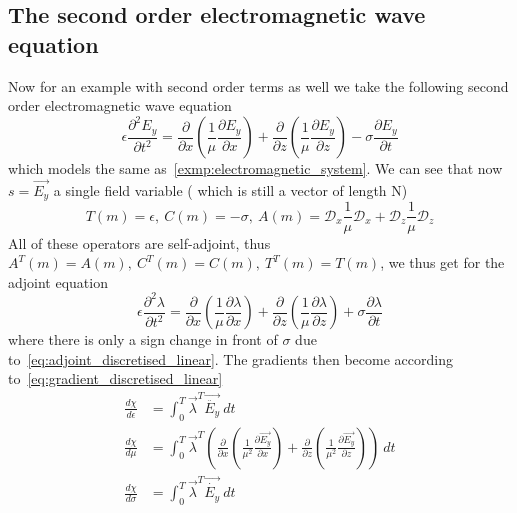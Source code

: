 \documentclass[10pt]{SelfArx} %
\newcommand{\pder}[2][]{\frac{\partial#1}{\partial#2}}
\newcommand{\ppder}[2][]{\frac{\partial^2#1}{\partial#2^2}}
\theoremstyle{definition}
\begin{document}
\subsection{The second order electromagnetic wave equation}
Now for an example with second order terms as well we take the following second order electromagnetic wave equation 
\begin{equation}
\epsilon \ppder[E_y]{t} = \pder{x}\left(\frac{1}{\mu}\pder[E_y]{x}\right) + \pder{z}\left(\frac{1}{\mu} \pder[E_y]{z}\right) - \sigma \pder[E_y]{t} 
\end{equation}
which models the same as~\cref{exmp:electromagnetic_system}. We can see that now $s = \vec{E_y}$ a single field variable ( which is still a vector of length N) 
\begin{equation}
T(m) = \epsilon, \ C(m) = -\sigma, \ A(m) = \mathcal{D}_x\frac{1}{\mu}\mathcal{D}_x + \mathcal{D}_z \frac{1}{\mu} \mathcal{D}_z
\end{equation}
All of these operators are self-adjoint, thus $A^T(m) = A(m), \ C^T(m) = C(m), \ T^T(m) = T(m) $, we thus get for the adjoint equation
\begin{equation}
\epsilon \ppder[\lambda]{t} = \pder{x}\left(\frac{1}{\mu}\pder[\lambda]{x}\right) + \pder{z}\left(\frac{1}{\mu} \pder[\lambda]{z}\right) + \sigma \pder[\lambda]{t} 
\end{equation}
where there is only a sign change in front of $\sigma$ due to~\cref{eq:adjoint_discretised_linear}. 
The gradients then become according to~\cref{eq:gradient_discretised_linear}
\begin{equation}
\begin{aligned}
\frac{d\chi}{d\epsilon} &= \int_0^T\vec{\lambda}^T\vec{\ddot{E_y}} \ dt \\
\frac{d\chi}{d\mu} &= \int_0^T\vec{\lambda}^T\left(\pder{x}\left(\frac{1}{\mu^2}\pder[\vec{E_y}]{x}\right) + \pder{z}\left(\frac{1}{\mu^2} \pder[\vec{E_y}]{z}\right)\right)\ dt \\
\frac{d\chi}{d\sigma}& = \int_0^T\vec{\lambda}^T\vec{\dot{E_y}} \  dt
\end{aligned}
\end{equation}
\end{document}
